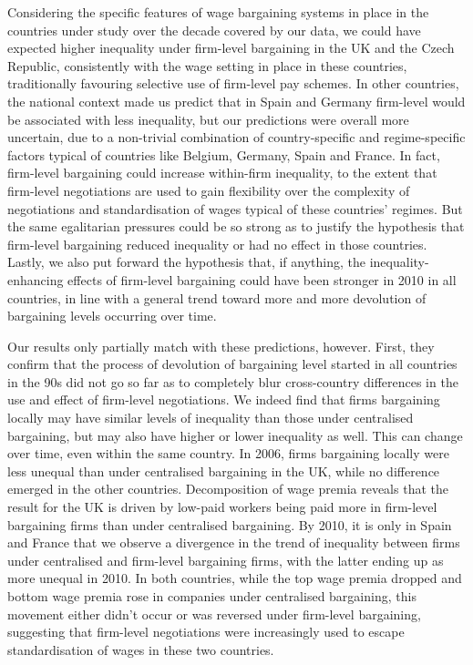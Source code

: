\documentclass[12pt]{article}
\begin{document}
Considering the specific features of wage bargaining systems in place in the countries under study over the decade covered by our data, we could have expected higher inequality under firm-level bargaining in the UK and the Czech Republic, consistently with the wage setting in place in these countries, traditionally favouring selective use of firm-level pay schemes. In other countries, the national context made us predict that in Spain and Germany firm-level would be associated with less inequality, but our predictions were overall more uncertain, due to a non-trivial combination of country-specific and regime-specific factors typical of countries like Belgium, Germany, Spain and France. In fact, firm-level bargaining could increase within-firm inequality, to the extent that firm-level negotiations are used to gain flexibility over the complexity of negotiations and standardisation of wages typical of these countries' regimes. But the same egalitarian pressures could be so strong as to justify the hypothesis that firm-level bargaining reduced inequality or had no effect in those countries. Lastly, we also put forward the hypothesis that, if anything, the inequality-enhancing effects of firm-level bargaining could have been stronger in 2010 in all countries, in line with a general trend toward more and more devolution of bargaining levels occurring over time.

Our results only partially match with these predictions, however. First, they confirm that the process of devolution of bargaining level started in all countries in the 90s did not go so far as to completely blur cross-country differences in the use and effect of firm-level negotiations. We indeed find that firms bargaining locally may have similar levels of inequality than those under centralised bargaining, but may also have higher or lower inequality as well. This can change over time, even within the same country. In 2006, firms bargaining locally were less unequal than under centralised bargaining in the UK, while no difference emerged in the other countries. Decomposition of wage premia reveals that the result for the UK is driven by low-paid workers being paid more in firm-level bargaining firms than under centralised bargaining. By 2010, it is only in Spain and France that we observe a divergence in the trend of inequality between firms under centralised and firm-level bargaining firms, with the latter ending up as more unequal in 2010. In both countries, while the top wage premia dropped and bottom wage premia rose in companies under centralised bargaining, this movement either didn't occur or was reversed under firm-level bargaining, suggesting that firm-level negotiations were increasingly used to escape standardisation of wages in these two countries. 
\end{document}
